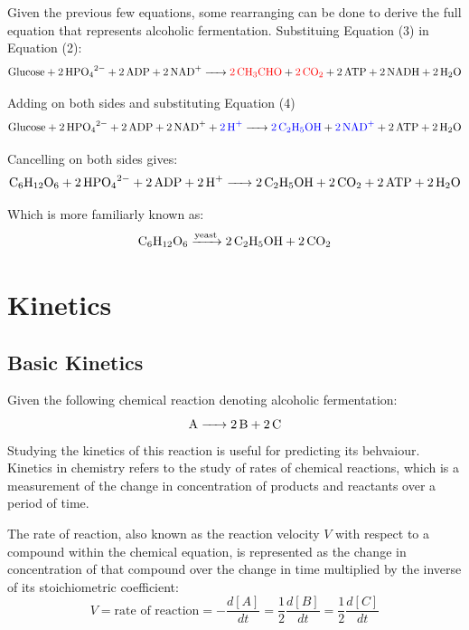 \documentclass{article}
\begin{document}
Given the previous few equations, some rearranging can be done to derive the full equation that represents alcoholic fermentation. Substituing Equation (3) in Equation (2):
\begin{equation*}
    \ce{Glucose + 2HPO_{4}^{2-} + 2ADP + 2NAD+ -> \textcolor{red}{\ce{2CH3CHO}} + \textcolor{red}{\ce{2CO2}} + 2ATP + 2NADH + 2H2O}
\end{equation*}

Adding  on both sides and substituting Equation (4)
\begin{equation*}
    \ce{Glucose + 2HPO_{4}^{2-} + 2ADP + 2NAD+ + \textcolor{blue}{\ce{2H+}} -> \textcolor{blue}{\ce{2C2H5OH}} + \textcolor{blue}{\ce{2NAD+}} + 2ATP + 2H2O}
\end{equation*}

Cancelling  on both sides gives:
\begin{equation}
    \ce{C6H12O6 + 2HPO_{4}^{2-} + 2ADP + 2H+ -> 2C2H5OH + 2CO2 + 2ATP + 2H2O}
\end{equation}

Which is more familiarly known as:
\begin{equation}
    \ce{C6H12O6 ->[yeast] 2C2H5OH + 2CO2}
\end{equation}

\section{Kinetics}

\subsection{Basic Kinetics}
Given the following chemical reaction denoting alcoholic fermentation:
\begin{equation}
    \ce{A -> 2B + 2C}
\end{equation}
Studying the kinetics of this reaction is useful for predicting its behvaiour. Kinetics in chemistry refers to the study of rates of chemical reactions, which is a measurement of the change in concentration of products and reactants over a period of time.

\medskip

The rate of reaction, also known as the reaction velocity $V$ with respect to a compound within the chemical equation, is represented as the change in concentration of that compound over the change in time multiplied by the inverse of its stoichiometric coefficient:
\begin{equation}
    V = \text{rate of reaction} = -\frac{d[A]}{dt} = \frac{1}{2}\frac{d[B]}{dt} = \frac{1}{2}\frac{d[C]}{dt}
\end{equation}
\end{document}
